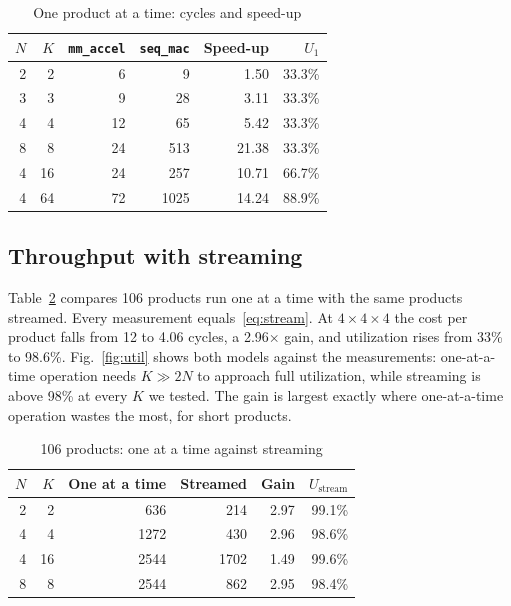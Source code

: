 \documentclass[conference]{IEEEtran}
\newcommand{\code}[1]{\texttt{#1}}
\begin{document}
\begin{table}[t]
\centering
\caption{One product at a time: cycles and speed-up}
\label{tab:lat}
\begin{tabular}{rrrrrr}
\toprule
$N$ & $K$ & \code{mm\_accel} & \code{seq\_mac} & Speed-up & $U_1$ \\
\midrule
2 & 2 & 6 & 9 & 1.50 & 33.3\% \\
3 & 3 & 9 & 28 & 3.11 & 33.3\% \\
4 & 4 & 12 & 65 & 5.42 & 33.3\% \\
8 & 8 & 24 & 513 & 21.38 & 33.3\% \\
4 & 16 & 24 & 257 & 10.71 & 66.7\% \\
4 & 64 & 72 & 1025 & 14.24 & 88.9\% \\
\bottomrule
\end{tabular}
\end{table}

\subsection{Throughput with streaming}
Table~\ref{tab:stream} compares 106 products run one at a time with the same products streamed. Every measurement equals~\eqref{eq:stream}. At $4\times4\times4$ the cost per product falls from 12 to 4.06 cycles, a 2.96$\times$ gain, and utilization rises from 33\% to 98.6\%. Fig.~\ref{fig:util} shows both models against the measurements: one-at-a-time operation needs $K \gg 2N$ to approach full utilization, while streaming is above 98\% at every $K$ we tested. The gain is largest exactly where one-at-a-time operation wastes the most, for short products.

\begin{table}[t]
\centering
\caption{106 products: one at a time against streaming}
\label{tab:stream}
\begin{tabular}{rrrrrr}
\toprule
$N$ & $K$ & One at a time & Streamed & Gain & $U_{\text{stream}}$ \\
\midrule
2 & 2 & 636 & 214 & 2.97 & 99.1\% \\
4 & 4 & 1272 & 430 & 2.96 & 98.6\% \\
4 & 16 & 2544 & 1702 & 1.49 & 99.6\% \\
8 & 8 & 2544 & 862 & 2.95 & 98.4\% \\
\bottomrule
\end{tabular}
\end{table}
\end{document}
